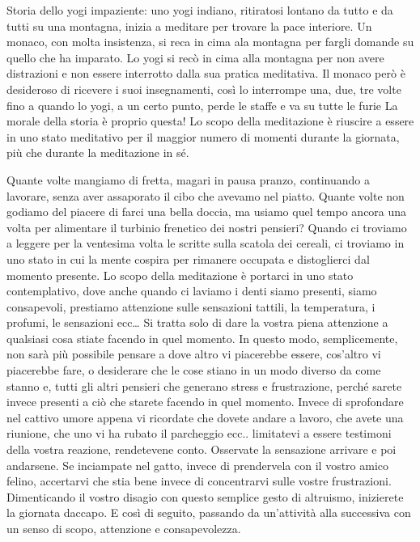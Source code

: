 \documentclass[12pt]{book} %
\begin{document}
\begin{mdframed}[linewidth=1pt]
Storia dello yogi impaziente: uno yogi indiano, ritiratosi lontano da tutto e da tutti su una montagna, inizia a
meditare per trovare la pace interiore. Un monaco, con molta insistenza, si reca in cima ala montagna per fargli
domande su quello che ha imparato. Lo yogi si recò in cima alla montagna per non avere distrazioni e non essere
interrotto dalla sua pratica meditativa. Il monaco però è desideroso di ricevere i suoi insegnamenti, così lo
interrompe una, due, tre volte fino a quando lo yogi, a un certo punto, perde le staffe e va su tutte le furie La
morale della storia è proprio questa! Lo scopo della meditazione è riuscire a essere in uno stato meditativo per il
maggior numero di momenti durante la giornata, più che durante la meditazione in sé.
\end{mdframed}

Quante volte mangiamo di fretta, magari in pausa pranzo, continuando a lavorare, senza aver assaporato il cibo che
avevamo nel piatto. Quante volte non godiamo del piacere di farci una bella doccia, ma usiamo quel tempo ancora una
volta per alimentare il turbinio frenetico dei nostri pensieri? Quando ci troviamo a leggere per la ventesima volta le
scritte sulla scatola dei cereali, ci troviamo in uno stato in cui la mente cospira per rimanere occupata e
distoglierci dal momento presente. Lo scopo della meditazione è portarci in uno stato contemplativo, dove anche quando
ci laviamo i denti siamo presenti, siamo consapevoli, prestiamo attenzione sulle sensazioni tattili, la temperatura, i
profumi, le sensazioni ecc… Si tratta solo di dare la vostra piena attenzione a qualsiasi cosa stiate facendo in quel
momento. In questo modo, semplicemente, non sarà più possibile pensare a dove altro vi piacerebbe essere,
cos'altro vi piacerebbe fare, o desiderare che le cose stiano in un modo diverso da come stanno e,
tutti gli altri pensieri che generano stress e frustrazione, perché sarete invece presenti a ciò che starete facendo in
quel momento. Invece di sprofondare nel cattivo umore appena vi ricordate che dovete andare a lavoro, che avete una
riunione, che uno vi ha rubato il parcheggio ecc.. limitatevi a essere testimoni della vostra reazione, rendetevene
conto. Osservate la sensazione arrivare e poi andarsene. Se inciampate nel gatto, invece di prendervela con il vostro
amico felino, accertarvi che stia bene invece di concentrarvi sulle vostre frustrazioni. Dimenticando il vostro disagio
con questo semplice gesto di altruismo, inizierete la giornata daccapo. E così di seguito, passando da
un'attività alla successiva con un senso di scopo, attenzione e consapevolezza.
\end{document}

